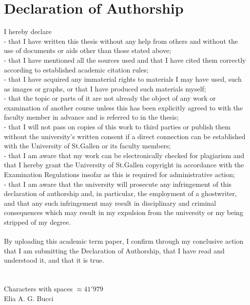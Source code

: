 \documentclass[12pt]{article}
\numberwithin{equation}{subsection}
\let\oldsection\section%
\renewcommand{\section}{%
  \renewcommand{\theequation}{\thesection.\arabic{equation}}%
  \oldsection}%
\begin{document}
\section*{Declaration of Authorship}
I hereby declare\\
- that I have written this thesis without any help from others and without the use of documents 
or aids other than those stated above;\\
- that I have mentioned all the sources used and that I have cited them correctly according to 
established academic citation rules;\\
- that I have acquired any immaterial rights to materials I may have used, such as images or 
graphs, or that I have produced such materials myself;\\
- that the topic or parts of it are not already the object of any work or examination of another 
course unless this has been explicitly agreed to with the faculty member in advance and is 
referred to in the thesis;\\
- that I will not pass on copies of this work to third parties or publish them without the 
university’s written consent if a direct connection can be established with the University of 
St.Gallen or its faculty members;\\
- that I am aware that my work can be electronically checked for plagiarism and that I hereby 
grant the University of St.Gallen copyright in accordance with the Examination Regulations 
insofar as this is required for administrative action;\\
- that I am aware that the university will prosecute any infringement of this declaration of 
authorship and, in particular, the employment of a ghostwriter, and that any such infringement 
may result in disciplinary and criminal consequences which may result in my expulsion from the 
university or my being stripped of my degree.\\
\\
By uploading this academic term paper, I confirm through my conclusive action that I am submitting the Declaration of Authorship, that I have read and understood it, and that it is true.\\
\\
\\
Characters with spaces $\approx 41'979$\\
Elia A. G. Bucci
\end{document}
